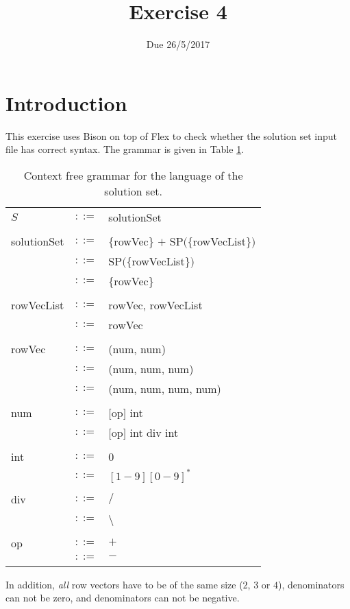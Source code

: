 \documentclass{article}
\begin{document}
\title{Exercise 4}
\date{Due 26/5/2017}
\maketitle

\section{Introduction}
This exercise uses Bison on top of Flex to check whether
the solution set input file has correct syntax.
The grammar is given in Table \ref{Table_CFG_Of_Solution_Set}.
\begin{table}[h]
\centering
\begin{tabular}{ l c l }
  $S$              & $::=$ & solutionSet                               \\ \\
  solutionSet      & $::=$ & $\{$rowVec$\}$ $+$ SP$(\{$rowVecList$\})$ \\
                   & $::=$ &                    SP$(\{$rowVecList$\})$ \\
                   & $::=$ & $\{$rowVec$\}$                            \\ \\
  rowVecList       & $::=$ & rowVec, rowVecList                        \\
                   & $::=$ & rowVec                                    \\ \\
  rowVec           & $::=$ & (num, num)                                \\
                   & $::=$ & (num, num, num)                           \\
                   & $::=$ & (num, num, num, num)                      \\ \\
  num              & $::=$ & $[$op$]$ int                              \\
                   & $::=$ & $[$op$]$ int div int                      \\ \\
  int              & $::=$ & 0                                         \\
                   & $::=$ & $[1-9][0-9]^{*}$                          \\ \\
  div              & $::=$ & $/$                                       \\
                   & $::=$ & \textbackslash                            \\ \\
  op               & $::=$ & $+$                                       \\
                   & $::=$ & $-$                                       \\ \\
\end{tabular}
\caption{
Context free grammar for the language of the solution set.
\label{Table_CFG_Of_Solution_Set}}
\end{table}
In addition, \textit{all} row vectors have to be of the same size
($2$, $3$ or $4$), denominators can not be zero, and denominators can not be negative.
\end{document}
